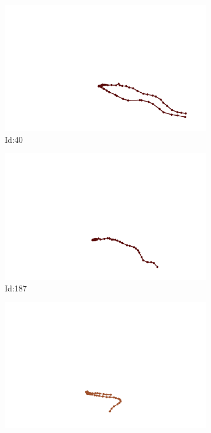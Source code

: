 \documentclass[12pt,twoside]{report}
\begin{document}
\begin{figure}
\centering
\begin{subfigure}[b]{0.20\textwidth}
\centering
\includegraphics[width=\textwidth]{../../trajectories/40.png}
\caption{Id:40}
\end{subfigure}
\begin{subfigure}[b]{0.20\textwidth}
\centering
\includegraphics[width=\textwidth]{../../trajectories/187.png}
\caption{Id:187}
\end{subfigure}
\begin{subfigure}[b]{0.20\textwidth}
\centering
\includegraphics[width=\textwidth]{../../trajectories/600.png}

\end{subfigure}
\end{figure}
\end{document}
